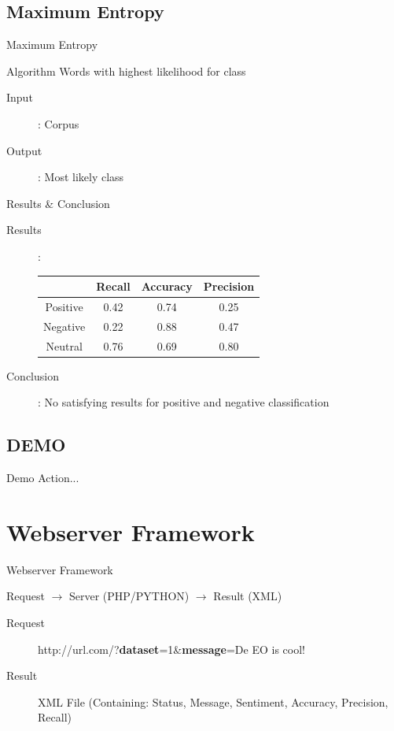 \documentclass{beamer}
\begin{document}
\subsection{Maximum Entropy}
\begin{frame}{Maximum Entropy}
\begin{block}{Algorithm}
Words with highest likelihood for class
\end{block}
\begin{description}
\item[Input]: Corpus
\item[Output]: Most likely class
\end{description}
\end{frame}
\begin{frame}{Results \& Conclusion}
\begin{description}
\item[Results]: 
\begin{tabular}{c || c | c | c}\\
 & Recall & Accuracy & Precision \\
\hline
Positive & 0.42 & 0.74 & 0.25\\
Negative & 0.22 & 0.88 & 0.47 \\
Neutral & 0.76 & 0.69 & 0.80 \\
\end{tabular}
\item[Conclusion]: No satisfying results for positive and negative classification
\end{description}
\end{frame}

\subsection{DEMO}
\begin{frame}{Demo}
Action...
\end{frame}


\section{Webserver Framework}
\begin{frame}{Webserver Framework}
\begin{center}
Request $\rightarrow$ Server (PHP/PYTHON) $\rightarrow$ Result (XML)
\end{center}

\begin{description}
\item[Request] http://url.com/?\textbf{dataset}=1\&\textbf{message}=De EO is cool!\\
\item[Result] XML File (Containing: Status, Message, Sentiment, Accuracy, Precision, Recall)
\end{description}
\end{frame}
\end{document}

